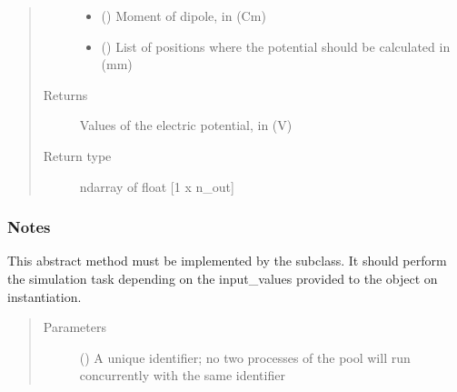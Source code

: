 \documentclass[letterpaper,10pt,english,openany,oneside]{sphinxmanual}
\begin{document}
\begin{fulllineitems}
\begin{quote}
\begin{description}
\begin{itemize}
\item {} 
\sphinxstyleliteralstrong{\sphinxupquote{{[}}}\sphinxstyleliteralstrong{\sphinxupquote{{]}}} (\sphinxstyleliteralemphasis{\sphinxupquote{ {[}}}\sphinxstyleliteralemphasis{\sphinxupquote{{]}}}) \textendash{} Moment of dipole, in (Cm)

\item {} 
\sphinxstyleliteralstrong{\sphinxupquote{{[}}}\sphinxstyleliteralstrong{\sphinxupquote{{]}}} (\sphinxstyleliteralemphasis{\sphinxupquote{ {[}}}\sphinxstyleliteralemphasis{\sphinxupquote{{]}}}) \textendash{} List of positions where the potential should be calculated in (mm)

\end{itemize}

\item[{Returns}] \leavevmode
{} \textendash{} Values of the electric potential, in (V)

\item[{Return type}] \leavevmode
ndarray of float {[}1 x n\_out{]}

\end{description}\end{quote}
\subsubsection*{Notes}

\begin{fulllineitems}
\label{\detokenize{pygpc.testfunctions:pygpc.testfunctions.testfunctions.PotentialDipole3Layers.simulate}}
This abstract method must be implemented by the subclass.
It should perform the simulation task depending on the input\_values provided to the object on instantiation.
\begin{quote}\begin{description}
\item[{Parameters}] \leavevmode
{} () \textendash{} A unique identifier; no two processes of the pool will run concurrently with the same identifier


\end{description}
\end{quote}
\end{fulllineitems}
\end{fulllineitems}
\end{document}

